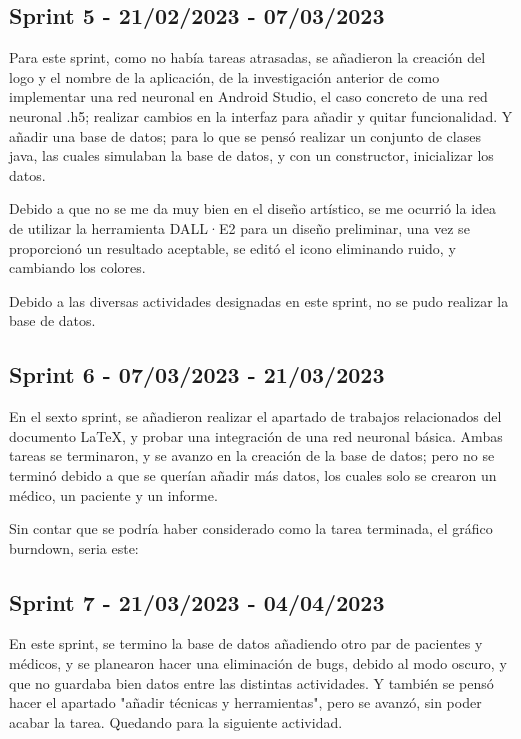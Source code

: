 \subsection{Sprint 5 - 21/02/2023 - 07/03/2023}
Para este sprint, como no había tareas atrasadas, se añadieron la creación del logo y el nombre de la aplicación, de la investigación anterior de como implementar una red neuronal en Android Studio, el caso concreto de una red neuronal .h5; realizar cambios en la interfaz para añadir y quitar funcionalidad. Y añadir una base de datos; para lo que se pensó realizar un conjunto de clases java, las cuales simulaban la base de datos, y con un constructor, inicializar los datos.

Debido a que no se me da muy bien en el diseño artístico, se me ocurrió la idea de utilizar la herramienta DALL·E2 para un diseño preliminar, una vez se proporcionó un resultado aceptable, se editó el icono eliminando ruido, y cambiando los colores.

Debido a las diversas actividades designadas en este sprint, no se pudo realizar la base de datos.

\subsection{Sprint 6 - 07/03/2023 - 21/03/2023}
En el sexto sprint, se añadieron realizar el apartado de trabajos relacionados del documento LaTeX, y probar una integración de una red neuronal básica.
Ambas tareas se terminaron, y se avanzo en la creación de la base de datos; pero no se terminó debido a que se querían añadir más datos, los cuales solo se crearon un médico, un paciente y un informe.

Sin contar que se podría haber considerado como la tarea terminada, el gráfico burndown, seria este:

\subsection{Sprint 7 - 21/03/2023 - 04/04/2023}
En este sprint, se termino la base de datos añadiendo otro par de pacientes y médicos, y se planearon hacer una eliminación de bugs, debido al modo oscuro, y que no guardaba bien datos entre las distintas actividades. Y también se pensó hacer el apartado "añadir técnicas y herramientas", pero se avanzó, sin poder acabar la tarea. Quedando para la siguiente actividad.

